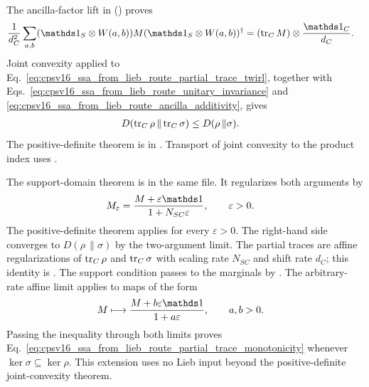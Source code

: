 \documentclass[11pt]{article}
\begin{document}
\begin{enumerate}
    The ancilla-factor lift
     in
    () proves
    \begin{align}
        \frac{1}{d_C^2}\sum_{a,b}
        (\Id_S\otimes W(a,b))M(\Id_S\otimes W(a,b))^\dagger
            &= (\tr_C M)\otimes\frac{\Id_C}{d_C}.
        \label{eq:cpsv16_ssa_from_lieb_route_partial_trace_twirl}
    \end{align}
    Joint convexity applied to
    Eq.~\ref{eq:cpsv16_ssa_from_lieb_route_partial_trace_twirl}, together with
    Eqs.~\ref{eq:cpsv16_ssa_from_lieb_route_unitary_invariance} and
    \ref{eq:cpsv16_ssa_from_lieb_route_ancilla_additivity}, gives
    \begin{align}
        D(\operatorname{tr}_C\rho\,\| \operatorname{tr}_C\sigma)
            &\leq D(\rho\,\| \sigma).
        \label{eq:cpsv16_ssa_from_lieb_route_partial_trace_monotonicity}
    \end{align}
    The positive-definite theorem is
     in
    . Transport
    of joint convexity to the product index uses
    .

    The support-domain theorem is
     in the same
    file. It regularizes both arguments by
    \begin{align}
        M_\varepsilon
            &= \frac{M+\varepsilon\Id}{1+N_{SC}\varepsilon},
        \qquad \varepsilon>0.
        \label{eq:cpsv16_ssa_from_lieb_route_data_processing_regularization}
    \end{align}
    The positive-definite theorem applies for every $\varepsilon>0$. The
    right-hand side converges to $D(\rho\,\| \sigma)$ by the two-argument
    limit. The partial traces are affine regularizations of
    $\operatorname{tr}_C\rho$ and $\operatorname{tr}_C\sigma$ with scaling rate $N_{SC}$ and shift rate
    $d_C$; this identity is
    . The support condition passes
    to the marginals by . The
    arbitrary-rate affine limit
    applies to maps of the form
    \begin{align}
        M
            &\longmapsto
            \frac{M+b\varepsilon\Id}{1+a\varepsilon},
        \qquad a,b>0.
        \label{eq:cpsv16_ssa_from_lieb_route_arbitrary_affine_regularization}
    \end{align}
    Passing the inequality through both limits proves
    Eq.~\ref{eq:cpsv16_ssa_from_lieb_route_partial_trace_monotonicity} whenever
    $\ker\sigma\subseteq\ker\rho$. This extension uses no Lieb input beyond the
    positive-definite joint-convexity theorem.


\end{enumerate}
\end{document}
